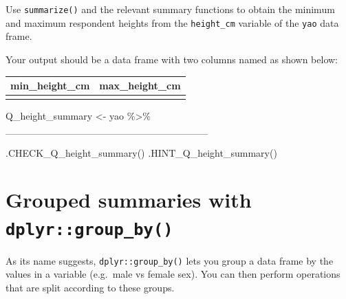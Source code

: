 \documentclass[
  letterpaper,
  DIV=11,
  numbers=noendperiod]{scrreprt}
\newenvironment{Shaded}{\begin{snugshade}}{\end{snugshade}}
\newcommand{\FunctionTok}[1]{\textcolor[rgb]{0.28,0.35,0.67}{#1}}
\newcommand{\NormalTok}[1]{\textcolor[rgb]{0.00,0.23,0.31}{#1}}
\newcommand{\OtherTok}[1]{\textcolor[rgb]{0.00,0.23,0.31}{#1}}
\newcommand{\SpecialCharTok}[1]{\textcolor[rgb]{0.37,0.37,0.37}{#1}}
\begin{document}
\begin{tcolorbox}[enhanced jigsaw, titlerule=0mm, colback=white, left=2mm, breakable, opacitybacktitle=0.6, colbacktitle=quarto-callout-tip-color!10!white, colframe=quarto-callout-tip-color-frame, bottomtitle=1mm, opacityback=0, coltitle=black, arc=.35mm, toptitle=1mm, title=\textcolor{quarto-callout-tip-color}{\faLightbulb}\hspace{0.5em}{Practice}, leftrule=.75mm, toprule=.15mm, bottomrule=.15mm, rightrule=.15mm]

Use \texttt{summarize()} and the relevant summary functions to obtain
the minimum and maximum respondent heights from the \texttt{height\_cm}
variable of the \texttt{yao} data frame.

Your output should be a data frame with two columns named as shown
below:

\begin{longtable}[]{@{}ll@{}}
\toprule\noalign{}
min\_height\_cm & max\_height\_cm \\
\midrule\noalign{}
\endhead
\bottomrule\noalign{}
\endlastfoot
& \\
\end{longtable}

\begin{Shaded}
\begin{Highlighting}[]
\NormalTok{Q\_height\_summary }\OtherTok{\textless{}{-}} 
\NormalTok{  yao }\SpecialCharTok{\%\textgreater{}\%} 
\NormalTok{  \_\_\_\_\_\_\_\_\_\_\_\_\_\_\_\_\_\_\_\_\_\_\_\_\_\_\_\_}
\end{Highlighting}
\end{Shaded}

\begin{Shaded}
\begin{Highlighting}[]
\FunctionTok{.CHECK\_Q\_height\_summary}\NormalTok{()}
\FunctionTok{.HINT\_Q\_height\_summary}\NormalTok{()}
\end{Highlighting}
\end{Shaded}

\end{tcolorbox}

\section{\texorpdfstring{Grouped summaries with
\texttt{dplyr::group\_by()}}{Grouped summaries with dplyr::group\_by()}}\label{grouped-summaries-with-dplyrgroup_by}

As its name suggests, \texttt{dplyr::group\_by()} lets you group a data
frame by the values in a variable (e.g.~male vs female sex). You can
then perform operations that are split according to these groups.
\end{document}

